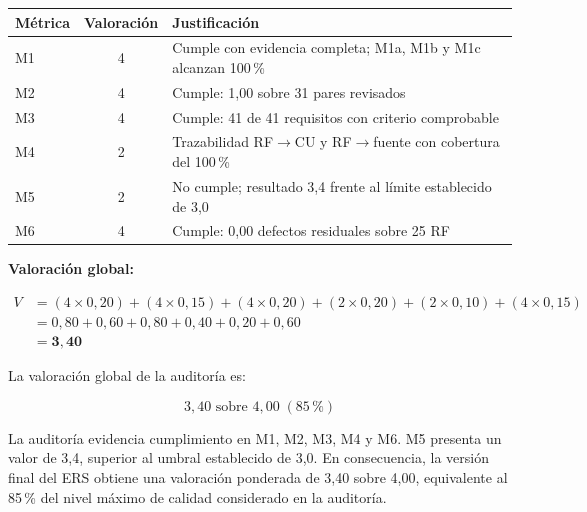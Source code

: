 \begin{tabular}{lcl}
\hline
\textbf{Métrica} &
\textbf{Valoración} &
\textbf{Justificación} \\
\hline

M1 & 4 &
Cumple con evidencia completa; M1a, M1b y M1c alcanzan 100\,\% \\

M2 & 4 &
Cumple: 1,00 sobre 31 pares revisados \\

M3 & 4 &
Cumple: 41 de 41 requisitos con criterio comprobable \\

M4 & 2 &
Trazabilidad RF$\rightarrow$CU y RF$\rightarrow$fuente con cobertura del 100\,\% \\

M5 & 2 &
No cumple; resultado 3,4 frente al límite establecido de 3,0 \\

M6 & 4 &
Cumple: 0,00 defectos residuales sobre 25 RF \\

\hline
\end{tabular}

\vspace{0.2cm}

\noindent\textbf{Valoración global:}

\begin{equation}
\begin{aligned}
V &=
(4\times0{,}20)
+(4\times0{,}15)
+(4\times0{,}20)
+(2\times0{,}20)
+(2\times0{,}10)
+(4\times0{,}15)\\
&=0{,}80+0{,}60+0{,}80+0{,}40+0{,}20+0{,}60\\
&=\mathbf{3{,}40}
\end{aligned}
\end{equation}

\noindent
La valoración global de la auditoría es:

\[
\boxed{3{,}40\text{ sobre }4{,}00\;(85\,\%)}
\]

La auditoría evidencia cumplimiento en M1, M2, M3, M4 y M6.
M5 presenta un valor de 3,4, superior al umbral establecido de 3,0.
En consecuencia, la versión final del ERS obtiene una valoración
ponderada de 3,40 sobre 4,00, equivalente al 85\,\% del nivel máximo
de calidad considerado en la auditoría.
